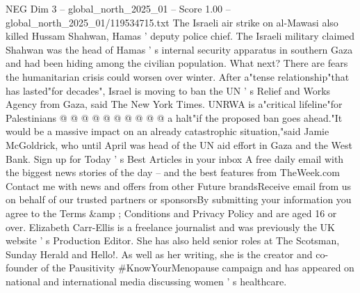 \begin{textsample}{NEG Dim 3 – global\_north\_2025\_01 – Score 1.00 – global\_north\_2025\_01/119534715.txt}
The Israeli air strike on al-Mawasi also killed Hussam Shahwan, Hamas ' deputy police chief.
The Israeli military claimed Shahwan was the head of Hamas ' s internal security apparatus in southern Gaza and had been hiding among the civilian population.
What next?
There are fears the humanitarian crisis could worsen over winter.
After a"tense relationship"that has lasted"for decades", Israel is moving to ban the UN ' s Relief and Works Agency from Gaza, said The New York Times.
UNRWA is a"critical lifeline"for Palestinians @ @ @ @ @ @ @ @ @ @ a halt"if the proposed ban goes ahead."It would be a massive impact on an already catastrophic situation,"said Jamie McGoldrick, who until April was head of the UN aid effort in Gaza and the West Bank.
Sign up for Today ' s Best Articles in your inbox A free daily email with the biggest news stories of the day -- and the best features from TheWeek.com Contact me with news and offers from other Future brandsReceive email from us on behalf of our trusted partners or sponsorsBy submitting your information you agree to the Terms \&amp ; Conditions and Privacy Policy and are aged 16 or over.
Elizabeth Carr-Ellis is a freelance journalist and was previously the UK website ' s Production Editor.
She has also held senior roles at The Scotsman, Sunday Herald and Hello!.
As well as her writing, she is the creator and co-founder of the Pausitivity \#KnowYourMenopause campaign and has appeared on national and international media discussing women ' s healthcare.

\end{textsample}
